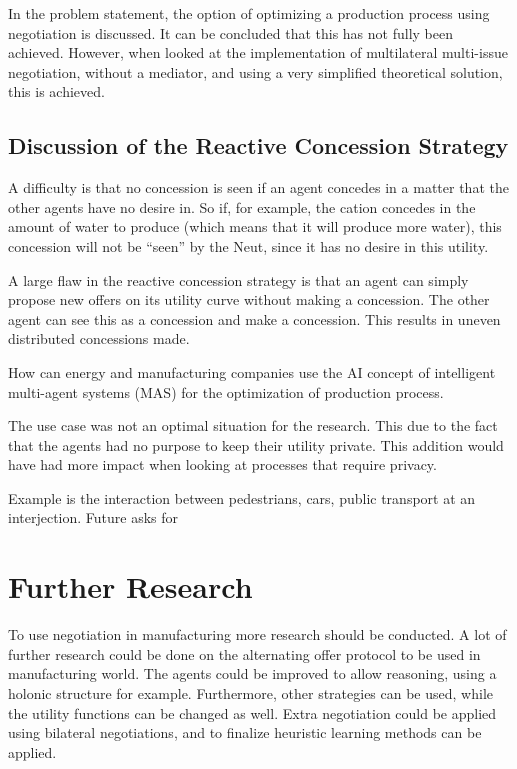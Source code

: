 In the problem statement, the option of optimizing a production process using negotiation is discussed. It can be concluded that this has not fully been achieved. However, when looked at the implementation of multilateral multi-issue negotiation, without a mediator, and using a very simplified theoretical solution, this is achieved. 

\subsection{Discussion of the Reactive Concession Strategy}

A difficulty is that no concession is seen if an agent concedes in a matter that the other agents have no desire in. So if, for example, the cation concedes in the amount of water to produce (which means that it will produce more water), this concession will not be ``seen'' by the Neut, since it has no desire in this utility. %


A large flaw in the reactive concession strategy is that an agent can simply propose new offers on its utility curve without making a concession. The other agent can see this as a concession and make a concession. This results in uneven distributed concessions made. 


How can energy and manufacturing companies use the AI concept of intelligent multi-agent systems (MAS) for the optimization of production process.

The use case was not an optimal situation for the research. This due to the fact that the agents had no purpose to keep their utility private. This addition would have had more impact when looking at processes that require privacy.

Example is the interaction between pedestrians, cars, public transport at an interjection. Future asks for 

\section{Further Research}
To use negotiation in manufacturing more research should be conducted. 
A lot of further research could be done on the alternating offer protocol to be used in manufacturing world. The agents could be improved to allow reasoning, using a holonic structure for example. Furthermore, other strategies can be used, while the utility functions can be changed as well. Extra negotiation could be applied using bilateral negotiations, and to finalize heuristic learning methods can be applied.


